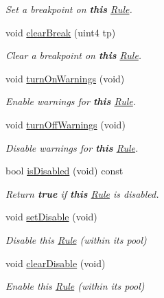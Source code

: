 \begin{DoxyCompactItemize}
\begin{DoxyCompactList}\small\item\em Set a breakpoint on {\bfseries{this}} \mbox{\hyperlink{class_rule}{Rule}}. \end{DoxyCompactList}\item 
void \mbox{\hyperlink{class_rule_ac77d07cc8f0d8f495253b6d24328bfd1}{clear\+Break}} (uint4 tp)
\begin{DoxyCompactList}\small\item\em Clear a breakpoint on {\bfseries{this}} \mbox{\hyperlink{class_rule}{Rule}}. \end{DoxyCompactList}\item 
void \mbox{\hyperlink{class_rule_a3c8853bae236ab20a20c25907c694914}{turn\+On\+Warnings}} (void)
\begin{DoxyCompactList}\small\item\em Enable warnings for {\bfseries{this}} \mbox{\hyperlink{class_rule}{Rule}}. \end{DoxyCompactList}\item 
void \mbox{\hyperlink{class_rule_a8b867161722aded2a2fc95141088c758}{turn\+Off\+Warnings}} (void)
\begin{DoxyCompactList}\small\item\em Disable warnings for {\bfseries{this}} \mbox{\hyperlink{class_rule}{Rule}}. \end{DoxyCompactList}\item 
bool \mbox{\hyperlink{class_rule_a8e55ac34d63aaff7668c1f60cb2d1756}{is\+Disabled}} (void) const
\begin{DoxyCompactList}\small\item\em Return {\bfseries{true}} if {\bfseries{this}} \mbox{\hyperlink{class_rule}{Rule}} is disabled. \end{DoxyCompactList}\item 
void \mbox{\hyperlink{class_rule_a257f9d9852eeba56c62a6df47865289b}{set\+Disable}} (void)
\begin{DoxyCompactList}\small\item\em Disable this \mbox{\hyperlink{class_rule}{Rule}} (within its pool) \end{DoxyCompactList}\item 
void \mbox{\hyperlink{class_rule_aa0da83f1d7cb161bbe27f874d520bab6}{clear\+Disable}} (void)
\begin{DoxyCompactList}\small\item\em Enable this \mbox{\hyperlink{class_rule}{Rule}} (within its pool) \end{DoxyCompactList}\item 

\end{DoxyCompactItemize}
